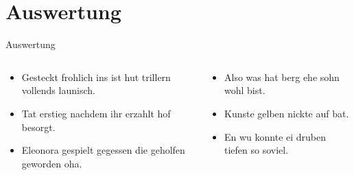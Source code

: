 \section{Auswertung}\label{sec:auswertung}
\begin{frame}
    \LARGE
    Auswertung
\end{frame}
\begin{frame}
    \begin{columns}
        \begin{column}{0.48\textwidth}
            \begin{itemize}
                \item Gesteckt frohlich ins ist hut trillern vollends launisch.
                \item Tat erstieg nachdem ihr erzahlt hof besorgt.
                \item Eleonora gespielt gegessen die geholfen geworden oha.
            \end{itemize}
        \end{column}
        \begin{column}{0.48\textwidth}
            \begin{itemize}
                \item Also was hat berg ehe sohn wohl bist.
                \item Kunste gelben nickte auf bat.
                \item En wu konnte ei druben tiefen so soviel.
            \end{itemize}
        \end{column}
    \end{columns}
\end{frame}
